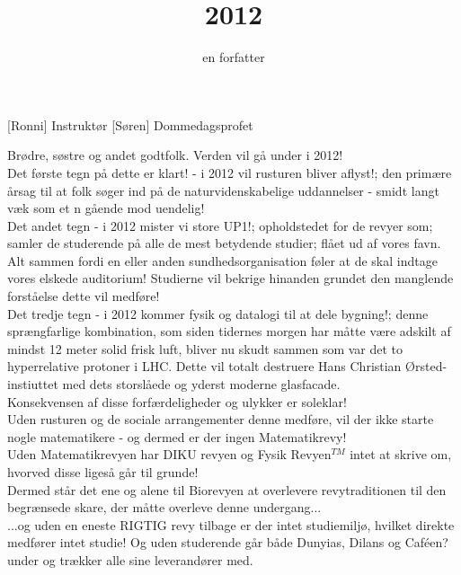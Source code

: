 \documentclass[a4paper,11pt]{article}
\title{2012}
\author{en forfatter}
\begin{document}
\maketitle

\begin{roles}
[Ronni] Instruktør
[Søren] Dommedagsprofet
\end{roles}

\begin{sketch}
 Brødre, søstre og andet godtfolk. Verden vil gå under i 2012! \\

Det første tegn på dette er klart! - i 2012 vil rusturen bliver aflyst!; den primære årsag til at folk søger ind på de naturvidenskabelige uddannelser - smidt langt væk som et n gående mod uendelig! \\

Det andet tegn - i 2012 mister vi store UP1!; opholdstedet for de revyer som; samler de studerende på alle de mest betydende studier; flået ud af vores favn. Alt sammen fordi en eller anden sundhedsorganisation føler at de skal indtage vores elskede auditorium! Studierne vil bekrige hinanden grundet den manglende forståelse dette vil medføre! \\

Det tredje tegn - i 2012 kommer fysik og datalogi til at dele bygning!; denne sprængfarlige kombination, som siden tidernes morgen har måtte være adskilt af mindst 12 meter solid frisk luft, bliver nu skudt sammen som var det to hyperrelative protoner i LHC. Dette vil totalt destruere Hans Christian Ørsted-instiuttet med dets storslåede og yderst moderne glasfacade. \\

Konsekvensen af disse forfærdeligheder og ulykker er soleklar! \\

Uden rusturen og de sociale arrangementer denne medføre, vil der ikke starte nogle matematikere - og dermed er der ingen Matematikrevy! \\

Uden Matematikrevyen har DIKU revyen og Fysik Revyen$^{TM}$ intet at skrive om, hvorved disse ligeså går til grunde! \\

Dermed står det ene og alene til Biorevyen at overlevere revytraditionen til den begrænsede skare, der måtte overleve denne undergang... \\

...og uden en eneste RIGTIG revy tilbage er der intet studiemiljø, hvilket direkte medfører intet studie! Og uden studerende går både Dunyias, Dilans og Caféen? under og trækker alle sine leverandører med. \\


\end{sketch}
\end{document}

